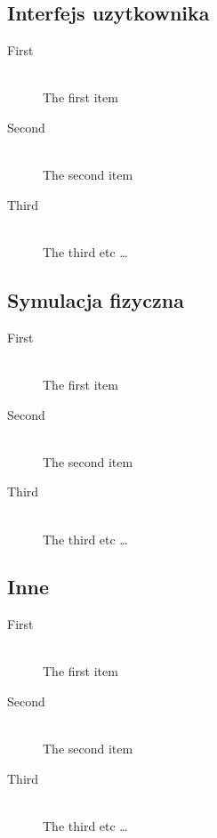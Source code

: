 \subsection{Interfejs uzytkownika}

\begin{description}
	\item[First] \hfill \\
	The first item
	\item[Second] \hfill \\
	The second item
	\item[Third] \hfill \\
	The third etc \ldots
\end{description}

\subsection{Symulacja fizyczna}

\begin{description}
	\item[First] \hfill \\
	The first item
	\item[Second] \hfill \\
	The second item
	\item[Third] \hfill \\
	The third etc \ldots
\end{description}

\subsection{Inne}

\begin{description}
	\item[First] \hfill \\
	The first item
	\item[Second] \hfill \\
	The second item
	\item[Third] \hfill \\
	The third etc \ldots
\end{description}
